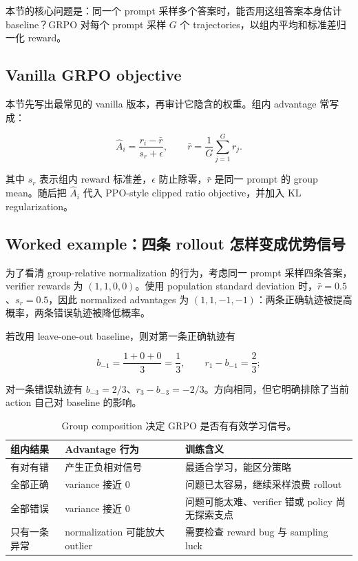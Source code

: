 \documentclass[a4paper]{article}
\begin{document}
本节的核心问题是：同一个 prompt 采样多个答案时，能否用这组答案本身估计 baseline？GRPO 对每个 prompt 采样 $G$ 个 trajectories，以组内平均和标准差归一化 reward。

\subsection{Vanilla GRPO objective}

本节先写出最常见的 vanilla 版本，再审计它隐含的权重。组内 advantage 常写成：

$$
\hat{A}_i=\frac{r_i-\bar r}{s_r+\epsilon},\qquad
\bar r=\frac{1}{G}\sum_{j=1}^{G}r_j.
$$

其中 $s_r$ 表示组内 reward 标准差，$\epsilon$ 防止除零，$\bar r$ 是同一 prompt 的 group mean。随后把 $\hat A_i$ 代入 PPO-style clipped ratio objective，并加入 KL regularization。

\subsection{Worked example：四条 rollout 怎样变成优势信号}

为了看清 group-relative normalization 的行为，考虑同一 prompt 采样四条答案，verifier rewards 为 $(1,1,0,0)$。使用 population standard deviation 时，$\bar r=0.5$、$s_r=0.5$，因此 normalized advantages 为 $(1,1,-1,-1)$：两条正确轨迹被提高概率，两条错误轨迹被降低概率。

若改用 leave-one-out baseline，则对第一条正确轨迹有

$$
b_{-1}=\frac{1+0+0}{3}=\frac{1}{3},
\qquad r_1-b_{-1}=\frac{2}{3};
$$

对一条错误轨迹有 $b_{-3}=2/3$、$r_3-b_{-3}=-2/3$。方向相同，但它明确排除了当前 action 自己对 baseline 的影响。

\begin{table}[H]
\centering
\begin{tabular}{L{0.22\textwidth}L{0.22\textwidth}L{0.46\textwidth}}
\toprule
组内结果 & Advantage 行为 & 训练含义 \\
\midrule
有对有错 & 产生正负相对信号 & 最适合学习，能区分策略 \\
全部正确 & variance 接近 0 & 问题已太容易，继续采样浪费 rollout \\
全部错误 & variance 接近 0 & 问题可能太难、verifier 错或 policy 尚无探索支点 \\
只有一条异常 & normalization 可能放大 outlier & 需要检查 reward bug 与 sampling luck \\
\bottomrule
\end{tabular}
\caption{Group composition 决定 GRPO 是否有有效学习信号。}
\end{table}
\end{document}

